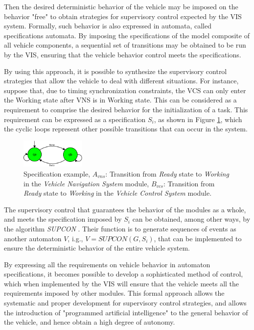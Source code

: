 \documentclass[conference]{IEEEtran}
\begin{document}
Then the desired deterministic behavior of the vehicle may be imposed on the behavior "free" to obtain strategies for supervisory control expected by the VIS system. Formally, such behavior is also expressed in automata, called specifications automata. By imposing the specifications of the model composite of all vehicle components, a sequential set of transitions may be obtained to be run by the VIS, ensuring that the vehicle behavior control meets the specifications.

By using this approach, it is possible to synthesize the supervisory control strategies that allow the vehicle to deal with different situations. For instance, suppose that, due to timing synchronization constraints, the VCS can only enter the Working state  after VNS is in Working state. This can be considered as a requirement to comprise the desired behavior for the initialization of a task. This requirement can be expressed as a specification $S_{i}$, as shown in Figure \ref{fig:VILMA_TRANSITION_EXAMPLE}, which the cyclic loops represent other possible transitions that can occur in the system.

\begin{figure}[h]
	\centering
	\includegraphics[width=120px,keepaspectratio]{imagens/VILMA_TRANSITION_EXAMPLE}
	\caption{Specification example, $A_{vns}$: Transition from \textit{Ready} state to \textit{Working} in the \textit{Vehicle Navigation System} module, $B_{vcs}$: Transition from \textit{Ready} state to \textit{Working} in the \textit{Vehicle Control System} module.}
	\label{fig:VILMA_TRANSITION_EXAMPLE}
\end{figure}

The supervisory control that guarantees the behavior of the modules as a whole, and meets the specification imposed by $S_{i}$ can be obtained, among other ways, by the algorithm \textit{SUPCON} \cite{supcom_wonham1987supremal}. Their function is to generate sequences of events as another automaton $V$, i.g., $V = SUPCON(G,S_{i})$, that can be implemented to ensure the deterministic behavior of the entire vehicle system.

By expressing all the requirements on vehicle behavior in automaton specifications, it becomes possible to develop a sophisticated method of control, which when implemented by the VIS will ensure that the vehicle meets all the requirements imposed by other modules. This formal approach allows the systematic and proper development for supervisory control strategies, and allows the introduction of "programmed artificial intelligence" to the general behavior of the vehicle, and hence obtain a high degree of autonomy.
\end{document}
